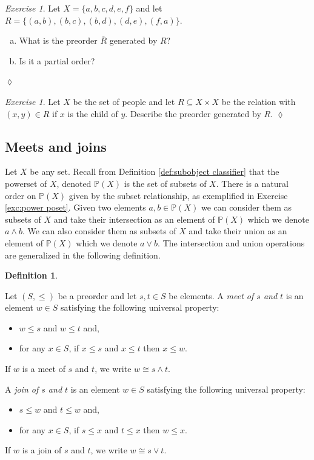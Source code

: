 \documentclass{book}
\def\PP{{\mathbb P}}
\def\ss{\subseteq}
\def\iso{\cong}
\def\ol{\overline}
\theoremstyle{remark}
\newtheorem{exc}[subsubsection]{Exercise}
\newenvironment{exercise}{\begin{exc}}{\hspace*{\fill}$\lozenge$\end{exc}}
\theoremstyle{definition}
\newtheorem{definition}[subsubsection]{Definition}
\def\sexc{\begin{enumerate}[a.)]\setlength{\itemsep}{.1cm}\setlength{\parskip}{.1cm}\item}
\def\next{\item}
\def\endsexc{\end{enumerate}}
\begin{document}
\begin{exercise}

Let $X=\{a,b,c,d,e,f\}$ and let $R=\{(a,b),(b,c),(b,d),(d,e),(f,a)\}$. 
\sexc What is the preorder $\ol{R}$ generated by $R$?
\next Is it a partial order?
\endsexc
\end{exercise}

\begin{exercise}
Let $X$ be the set of people and let $R\ss X\times X$ be the relation with $(x,y)\in R$ if $x$ is the child of $y$. Describe the preorder generated by $R$.
\end{exercise}


\subsection{Meets and joins}\label{sec:meets and joins}

Let $X$ be any set. Recall from Definition \ref{def:subobject classifier} that the powerset of $X$, denoted $\PP(X)$ is the set of subsets of $X$. There is a natural order on $\PP(X)$ given by the subset relationship, as exemplified in Exercise \ref{exc:power poset}. Given two elements $a,b\in\PP(X)$ we can consider them as subsets of $X$ and take their intersection as an element of $\PP(X)$ which we denote $a\wedge b$. We can also consider them as subsets of $X$ and take their union as an element of $\PP(X)$ which we denote $a\vee b$. The intersection and union operations are generalized in the following definition.

\begin{definition}\label{def:meets and joins}

Let $(S,\leq)$ be a preorder and let $s,t\in S$ be elements. A {\em meet of $s$ and $t$} is an element $w\in S$ satisfying the following universal property: 
\begin{itemize}
\item $w\leq s$ and $w\leq t$ and, 
\item for any $x\in S$, if $x\leq s$ and $x\leq t$ then $x\leq w$.
\end{itemize}
If $w$ is a meet of $s$ and $t$, we write $w\iso s\wedge t$.

A {\em join of $s$ and $t$} is an element $w\in S$ satisfying the following universal property: 
\begin{itemize}
\item $s\leq w$ and $t\leq w$ and, 
\item for any $x\in S$, if $s\leq x$ and $t\leq x$ then $w\leq x$.
\end{itemize}
If $w$ is a join of $s$ and $t$, we write $w\iso s\vee t$.

\end{definition}
\end{document}
